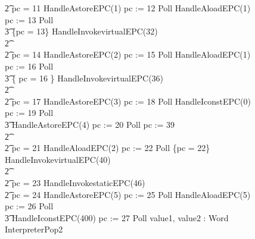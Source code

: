 \begin{figure}[tp!]
{\begin{circus}
    \t2 {} \circelse pc = 11 \circthen HandleAstoreEPC(1) \circseq pc := 12 \circseq Poll \circseq HandleAloadEPC(1) \circseq pc := 13 \circseq Poll \circseq \\
    \t3 \{pc = 13\} \circseq HandleInvokevirtualEPC(32) \\
    \t2 {} \cdots {} \\
    \t2 {} \circelse pc = 14 \circthen HandleAstoreEPC(2) \circseq pc := 15 \circseq Poll \circseq HandleAloadEPC(1) \circseq pc := 16 \circseq Poll \circseq \\
    \t3 \{ pc = 16 \} \circseq HandleInvokevirtualEPC(36) \\
    \t2 {} \cdots {} \\
    \t2 {} \circelse pc = 17 \circthen HandleAstoreEPC(3) \circseq pc := 18 \circseq Poll \circseq HandleIconstEPC(0) \circseq pc := 19 \circseq Poll \circseq \\
    \t3 HandleAstoreEPC(4) \circseq pc := 20 \circseq Poll \circseq pc := 39 \\
    \t2 {} \cdots {} \\
    \t2 {} \circelse pc = 21 \circthen HandleAloadEPC(2) \circseq pc := 22 \circseq Poll \circseq \{pc = 22\} \circseq HandleInvokevirtualEPC(40) \\
    \t2 {} \cdots {} \\
    \t2 {} \circelse pc = 23 \circthen HandleInvokestaticEPC(46) \\
    \t2 {} \circelse pc = 24 \circthen HandleAstoreEPC(5) \circseq pc := 25 \circseq Poll \circseq HandleAloadEPC(5) \circseq pc := 26 \circseq Poll \circseq \\
    \t3 HandleIconstEPC(400) \circseq pc := 27 \circseq Poll \circseq \circvar value1, value2 : Word \circspot InterpreterPop2 \circseq \\

\end{circus}}
\end{figure}
